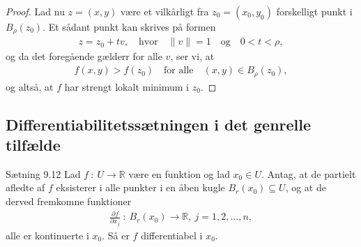 \begin{proof}
  Lad nu $z = (x,y)$ være et vilkårligt fra $z_0 = (x_0, y_0)$ forskelligt punkt i $B_\rho(z_0)$. Et sådant punkt kan skrives på formen
  \begin{align*}
    z = z_0 + tv, \quad \text{hvor} \quad \| v \| = 1 \quad \text{og} \quad 0 < t < \rho,
  \end{align*}
  og da det foregående gælderr for alle $v$, ser vi, at
  \begin{align*}
    f(x,y) > f(z_0) \quad \text{for alle} \quad (x,y) \in B_\rho(z_0),
  \end{align*}
  og altså, at $f$ har strengt lokalt minimum i $z_0$.
\end{proof}

\subsection{Differentiabilitetssætningen i det genrelle tilfælde}
\begin{boks}{Sætning 9.12}
  Lad $f \ : \ U \rightarrow \mathbb{R}$ være en funktion og lad $x_0 \in U$. Antag, at de partielt afledte af $f$ eksisterer i alle punkter i en åben kugle $B_r(x_0) \subseteq U$, og at de derved fremkomne funktioner
  \begin{align*}
    \frac{\partial f}{\partial x_j} \ : \ B_r(x_0) \rightarrow \mathbb{R}, \
    j = 1,2,\ldots,n,
  \end{align*}
  alle er kontinuerte i $x_0$. Så er $f$ differentiabel i $x_0$.
\end{boks}
